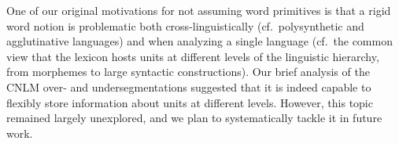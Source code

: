 One of our original motivations for not assuming word primitives is that a rigid word notion is problematic both cross-linguistically (cf.~polysynthetic and agglutinative languages) and when analyzing a single language (cf.~the common  view  that the lexicon hosts units at different levels of the linguistic hierarchy, from  morphemes to large syntactic constructions). Our brief analysis of the CNLM over- and undersegmentations suggested that it is indeed capable to flexibly store information about units at different levels. However, this topic  remained largely unexplored, and we plan to systematically tackle it in future work.

